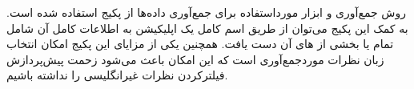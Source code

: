 \Section
{روش جمع‌آوری و ابزار مورداستفاده}
{
برای جمع‌آوری داده‌ها از پکیج
استفاده شده است. به کمک این پکیج می‌توان از طریق اسم کامل یک اپلیکیشن به اطلاعات کامل آن شامل تمام یا بخشی از 
های آن دست یافت. همچنین یکی از مزایای این پکیج امکان انتخاب زبان نظرات موردجمع‌آوری است که این امکان باعث می‌شود زحمت پیش‌پردازش فیلترکردن نظرات غیرانگلیسی را نداشته باشیم.
}